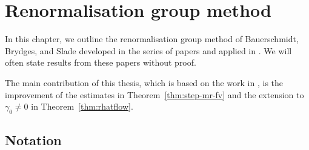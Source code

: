 \chapter{Renormalisation group method}
\label{sec:rg}

\renewcommand{\pm}{+}					%

In this chapter, we outline the renormalisation group method of Bauerschmidt,
Brydges, and Slade developed in the series of papers
\cite{BS-rg-norm,BS-rg-loc,BBS-rg-pt,BS-rg-IE,BS-rg-step} and
applied in \cite{BBS-phi4-log,BBS-saw4-log,BBS-saw4,ST-phi4}. We will often
state results from these papers without proof.

The main contribution of this
thesis, which is based on the work in \cite{BSTW-clp,BSW-saw-sa}, is the
improvement of the estimates in Theorem~\ref{thm:step-mr-fv} and the extension
to $\gamma_0 \ne 0$ in Theorem~\ref{thm:rhatflow}.


\section{Notation}

